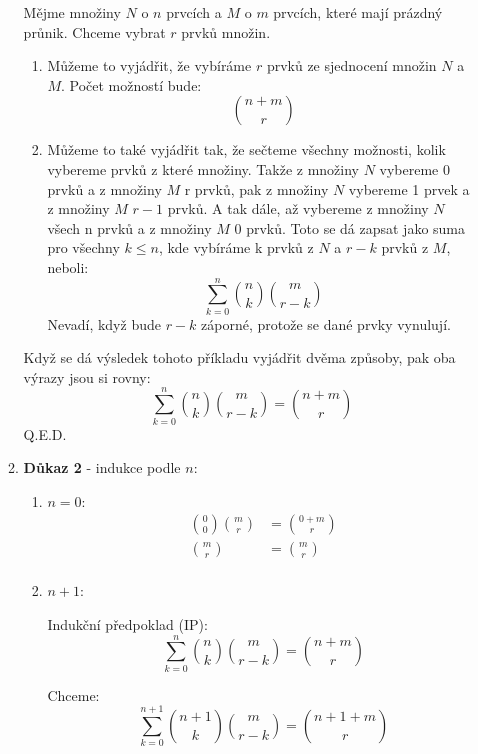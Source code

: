 \documentclass[12pt]{article}
\begin{document}
\begin{enumerate}
\begin{enumerate}
        Mějme množiny $N$ o $n$ prvcích a $M$ o $m$ prvcích, které mají prázdný průnik.
        Chceme vybrat $r$ prvků množin.
        \begin{enumerate}
        
          \item Můžeme to vyjádřit, že vybíráme $r$ prvků ze sjednocení množin $N$ a $M$.
          Počet možností bude:
          \[\binom{n+m}{r}\]
          
          \item Můžeme to také vyjádřit tak, že sečteme všechny možnosti, kolik vybereme prvků z které množiny.
          Takže z množiny $N$ vybereme 0 prvků a z množiny $M$ r prvků,
          pak z množiny $N$ vybereme 1 prvek a z množiny $M$ $r-1$ prvků. A tak dále, až vybereme
          z množiny $N$ všech n prvků a z množiny $M$ 0 prvků.
          Toto se dá zapsat jako suma pro všechny $k \le n$, kde vybíráme k prvků z $N$ a $r-k$ prvků z $M$,
          neboli:
          \[
            \sum_{k=0}^{n} \binom{n}{k}\binom{m}{r-k}
          \]
          Nevadí, když bude $r-k$ záporné, protože se dané prvky vynulují.
        \end{enumerate}
        
        Když se dá výsledek tohoto příkladu vyjádřit dvěma způsoby, pak oba výrazy jsou si rovny:
        \[
          \sum_{k=0}^{n} \binom{n}{k}\binom{m}{r-k} = \binom{n+m}{r}
        \]
        Q.E.D.

      \item \textbf{Důkaz 2} - indukce podle $n$:
        \begin{enumerate}
          \item $n=0$:
            \begin{align*}
              \binom{0}{0}\binom{m}{r} &= \binom{0+m}{r} \\
              \binom{m}{r} &= \binom{m}{r} \\
            \end{align*}
          \item $n+1$:

            Indukční předpoklad (IP):
            \[
              \sum_{k=0}^{n} \binom{n}{k}\binom{m}{r-k} = \binom{n+m}{r}
            \]

            Chceme:
            \[
              \sum_{k=0}^{n+1} \binom{n+1}{k}\binom{m}{r-k} = \binom{n+1+m}{r}
            \]


\end{enumerate}
\end{enumerate}
\end{enumerate}
\end{document}
